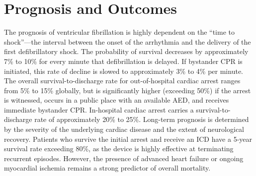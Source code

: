 \section*{Prognosis and Outcomes}
The prognosis of ventricular fibrillation is highly dependent on the ``time to shock''---the interval between the onset of the arrhythmia and the delivery of the first defibrillatory shock. The probability of survival decreases by approximately 7\% to 10\% for every minute that defibrillation is delayed. If bystander CPR is initiated, this rate of decline is slowed to approximately 3\% to 4\% per minute.
The overall survival-to-discharge rate for out-of-hospital cardiac arrest ranges from 5\% to 15\% globally, but is significantly higher (exceeding 50\%) if the arrest is witnessed, occurs in a public place with an available AED, and receives immediate bystander CPR. In-hospital cardiac arrest carries a survival-to-discharge rate of approximately 20\% to 25\%.
Long-term prognosis is determined by the severity of the underlying cardiac disease and the extent of neurological recovery. Patients who survive the initial arrest and receive an ICD have a 5-year survival rate exceeding 80\%, as the device is highly effective at terminating recurrent episodes. However, the presence of advanced heart failure or ongoing myocardial ischemia remains a strong predictor of overall mortality.

